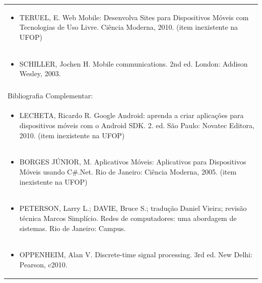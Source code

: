 \documentclass[11pt]{article}
\begin{document}
\begin{center}
\begin{longtable}{|p{4cm}|p{4cm}|p{4cm}|p{4cm}|}
\multicolumn{4}{|p{\dimexpr 16cm + 6\tabcolsep\relax}|}{\begin{itemize}\item TERUEL, E. Web Mobile: Desenvolva Sites para Dispositivos Móveis com Tecnologias de Uso Livre. Ciência Moderna, 2010. (item inexistente na UFOP)\end{itemize}}\\
\multicolumn{4}{|p{\dimexpr 16cm + 6\tabcolsep\relax}|}{\begin{itemize}\item SCHILLER, Jochen H. Mobile communications. 2nd ed. London: Addison Wesley, 2003.\end{itemize}}\\
\multicolumn{4}{|p{16cm}|}{}\\
\hline
\multicolumn{4}{|p{16cm}|}{Bibliografia Complementar:}\\*
\multicolumn{4}{|p{\dimexpr 16cm + 6\tabcolsep\relax}|}{\begin{itemize}\item LECHETA, Ricardo R. Google Android: aprenda a criar aplicações para dispositivos móveis com o Android SDK. 2. ed. São Paulo: Novatec Editora, 2010. (item inexistente na UFOP)\end{itemize}}\\
\multicolumn{4}{|p{\dimexpr 16cm + 6\tabcolsep\relax}|}{\begin{itemize}\item BORGES JÚNIOR, M. Aplicativos Móveis: Aplicativos para Dispositivos Móveis usando C\#.Net. Rio de Janeiro: Ciência Moderna, 2005. (item inexistente na UFOP)\end{itemize}}\\
\multicolumn{4}{|p{\dimexpr 16cm + 6\tabcolsep\relax}|}{\begin{itemize}\item PETERSON, Larry L.; DAVIE, Bruce S.; tradução Daniel Vieira; revisão técnica Marcos Simplício. Redes de computadores: uma abordagem de sistemas. Rio de Janeiro: Campus.\end{itemize}}\\
\multicolumn{4}{|p{\dimexpr 16cm + 6\tabcolsep\relax}|}{\begin{itemize}\item OPPENHEIM, Alan V. Discrete-time signal processing. 3rd ed. New Delhi: Pearson, c2010.\end{itemize}}\\
\hline
\end{longtable}
\end{center}
\end{document}

